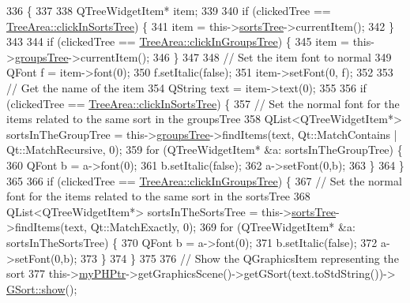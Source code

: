 \begin{DoxyCode}
336                                        \{
337 
338     QTreeWidgetItem* item;
339 
340     \textcolor{keywordflow}{if} (clickedTree == \hyperlink{classTreeArea_a580e62f552dbda007c636bc69cc5e0a7}{TreeArea::clickInSortsTree}) \{
341         item = this->\hyperlink{classTreeArea_ad323879d9e2e64b18dae18fe757b1b0e}{sortsTree}->currentItem();
342     \}
343 
344     \textcolor{keywordflow}{if} (clickedTree == \hyperlink{classTreeArea_a6c8a68ece69178b1c902cf8ee8652756}{TreeArea::clickInGroupsTree}) \{
345         item = this->\hyperlink{classTreeArea_ab3cf8ca35655b0bace24a7c46170852f}{groupsTree}->currentItem();
346     \}
347 
348     \textcolor{comment}{// Set the item font to normal}
349     QFont f = item->font(0);
350     f.setItalic(\textcolor{keyword}{false});
351     item->setFont(0, f);
352 
353     \textcolor{comment}{// Get the name of the item}
354     QString text = item->text(0);
355 
356     \textcolor{keywordflow}{if} (clickedTree == \hyperlink{classTreeArea_a580e62f552dbda007c636bc69cc5e0a7}{TreeArea::clickInSortsTree}) \{
357         \textcolor{comment}{// Set the normal font for the items related to the same sort in the groupsTree}
358         QList<QTreeWidgetItem*> sortsInTheGroupTree = this->\hyperlink{classTreeArea_ab3cf8ca35655b0bace24a7c46170852f}{groupsTree}->findItems(text, 
      Qt::MatchContains | Qt::MatchRecursive, 0);
359         \textcolor{keywordflow}{for} (QTreeWidgetItem* &a: sortsInTheGroupTree) \{
360             QFont b = a->font(0);
361             b.setItalic(\textcolor{keyword}{false});
362             a->setFont(0,b);
363         \}
364     \}
365 
366     \textcolor{keywordflow}{if} (clickedTree == \hyperlink{classTreeArea_a6c8a68ece69178b1c902cf8ee8652756}{TreeArea::clickInGroupsTree}) \{
367         \textcolor{comment}{// Set the normal font for the items related to the same sort in the sortsTree}
368         QList<QTreeWidgetItem*> sortsInTheSortsTree = this->\hyperlink{classTreeArea_ad323879d9e2e64b18dae18fe757b1b0e}{sortsTree}->findItems(text, 
      Qt::MatchExactly, 0);
369         \textcolor{keywordflow}{for} (QTreeWidgetItem* &a: sortsInTheSortsTree) \{
370             QFont b = a->font(0);
371             b.setItalic(\textcolor{keyword}{false});
372             a->setFont(0,b);
373         \}
374     \}
375 
376     \textcolor{comment}{// Show the QGraphicsItem representing the sort}
377     this->\hyperlink{classTreeArea_a290d659da16085f21c04f81fcd16891c}{myPHPtr}->getGraphicsScene()->getGSort(text.toStdString())->
      \hyperlink{classGSort_a6cb13a9b6ef35dc7698b165ff0d34b88}{GSort::show}();

\end{DoxyCode}
